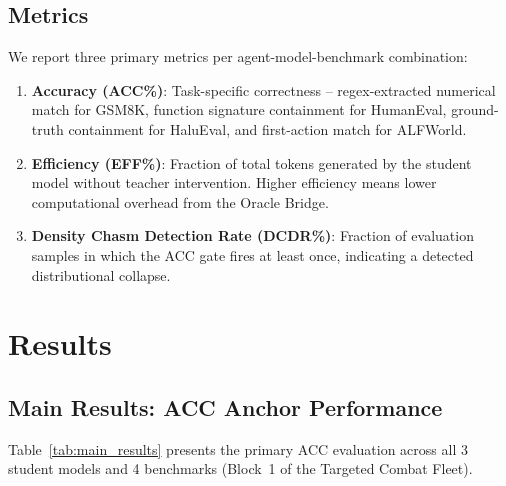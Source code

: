 \documentclass{uai2026}  %
\begin{document}
\subsection{Metrics}
We report three primary metrics per agent-model-benchmark combination:
\begin{enumerate}
  \item \textbf{Accuracy (ACC\%)}: Task-specific correctness -- regex-extracted numerical match for GSM8K, function signature containment for HumanEval, ground-truth containment for HaluEval, and first-action match for ALFWorld.
  \item \textbf{Efficiency (EFF\%)}: Fraction of total tokens generated by the student model without teacher intervention. Higher efficiency means lower computational overhead from the Oracle Bridge.
  \item \textbf{Density Chasm Detection Rate (DCDR\%)}: Fraction of evaluation samples in which the ACC gate fires at least once, indicating a detected distributional collapse.
\end{enumerate}

\section{Results}
\enlargethispage{2\baselineskip}
\label{sec:results}

\subsection{Main Results: ACC Anchor Performance}

Table~\ref{tab:main_results} presents the primary ACC evaluation across all 3 student models and 4 benchmarks (Block~1 of the Targeted Combat Fleet).
\end{document}
